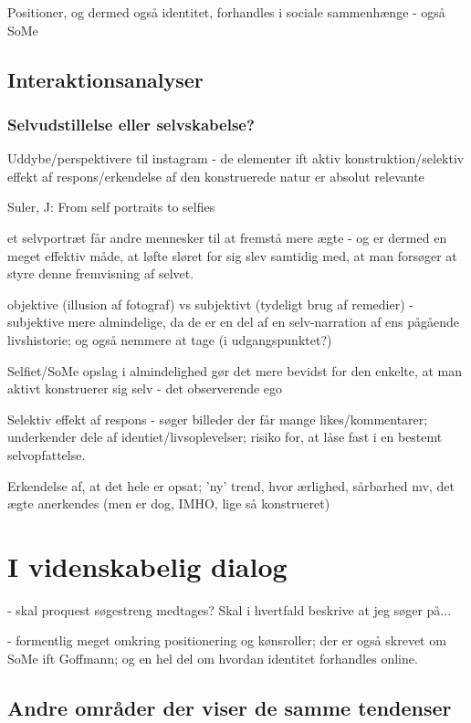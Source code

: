 Positioner, og dermed også identitet, forhandles i sociale
sammenhænge - også SoMe

\subsection{Interaktionsanalyser} 

\subsubsection{Selvudstillelse eller selvskabelse?}

Uddybe/perspektivere til instagram - de elementer ift aktiv
konstruktion/selektiv effekt af respons/erkendelse af den
konstruerede natur er absolut relevante

Suler, J: From self portraits to selfies

et selvportræt får andre mennesker til at fremstå mere ægte - og
er dermed en meget effektiv måde, at løfte sløret for sig slev
samtidig med, at man forsøger at styre denne fremvisning af
selvet.

objektive (illusion af fotograf) vs subjektivt (tydeligt brug af
remedier) - subjektive mere almindelige, da de er en del af en
selv-narration af ens pågående livshistorie; og også nemmere at
tage (i udgangspunktet?)

Selfiet/SoMe opslag i almindelighed gør det mere bevidst for den
enkelte, at man aktivt konstruerer sig selv - det observerende ego

Selektiv effekt af respons - søger billeder der får mange
likes/kommentarer; underkender dele af identiet/livsoplevelser;
risiko for, at låse fast i en bestemt selvopfattelse.

Erkendelse af, at det hele er opsat; 'ny' trend, hvor ærlighed,
sårbarhed mv, det ægte anerkendes (men er dog, IMHO, lige så
konstrueret)

\section{I videnskabelig dialog}

- skal proquest søgestreng medtages? Skal i hvertfald beskrive at 
jeg søger på...

- formentlig meget omkring positionering og kønsroller; der er
også skrevet om SoMe ift Goffmann; og en hel del om hvordan
identitet forhandles online.

\subsection{Andre områder der viser de samme tendenser} 

